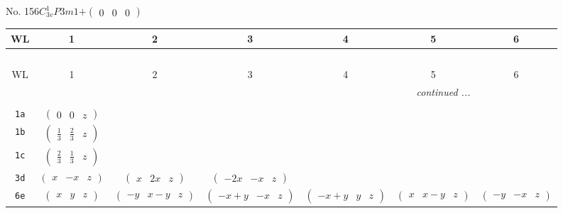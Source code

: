 \documentclass[fleqn,9pt,landscape]{jsarticle}
\begin{document}
\newpage
No. 156\quad$C_{3v}^{1}$\quad$P3m1$\quad[ trigonal ]\quad$+\begin{pmatrix} 0 & 0 & 0 \end{pmatrix}$
\begin{center}
\renewcommand{\arraystretch}{1.2}
\begin{longtable}{ccccccc}
 \hline \hline
WL & 1 & 2 & 3 & 4 & 5 & 6 \\ \hline \endfirsthead

\multicolumn{6}{l}{\tablename\ \thetable{}} \\
 \hline \hline
WL & 1 & 2 & 3 & 4 & 5 & 6 \\ \hline \endhead

 \hline \hline
\multicolumn{6}{r}{\footnotesize\it continued ...} \\ \endfoot

 \hline \hline
\multicolumn{6}{r}{} \\ \endlastfoot

{\tt 1a} & $ \begin{pmatrix} 0 & 0 & z \end{pmatrix} $ & $  $ & $  $ & $  $ & $  $ & $  $ \\ \hline
{\tt 1b} & $ \begin{pmatrix} \frac{1}{3} & \frac{2}{3} & z \end{pmatrix} $ & $  $ & $  $ & $  $ & $  $ & $  $ \\ \hline
{\tt 1c} & $ \begin{pmatrix} \frac{2}{3} & \frac{1}{3} & z \end{pmatrix} $ & $  $ & $  $ & $  $ & $  $ & $  $ \\ \hline
{\tt 3d} & $ \begin{pmatrix} x & - x & z \end{pmatrix} $ & $ \begin{pmatrix} x & 2 x & z \end{pmatrix} $ & $ \begin{pmatrix} - 2 x & - x & z \end{pmatrix} $ & $  $ & $  $ & $  $ \\ \hline
{\tt 6e} & $ \begin{pmatrix} x & y & z \end{pmatrix} $ & $ \begin{pmatrix} - y & x - y & z \end{pmatrix} $ & $ \begin{pmatrix} - x + y & - x & z \end{pmatrix} $ & $ \begin{pmatrix} - x + y & y & z \end{pmatrix} $ & $ \begin{pmatrix} x & x - y & z \end{pmatrix} $ & $ \begin{pmatrix} - y & - x & z \end{pmatrix} $ \\
\end{longtable}
\end{center}
\end{document}
